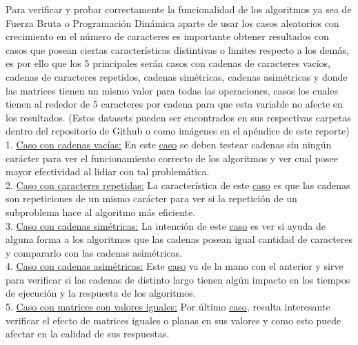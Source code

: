 Para verificar y probar correctamente la funcionalidad de los algoritmos ya sea de Fuerza Bruta o Programación Dinámica aparte de usar los casos aleatorios con crecimiento en el número de caracteres es importante obtener resultados con casos que posean ciertas características distintivas o limites respecto a los demás, es por ello que los 5 principales serán casos con cadenas de caracteres vacíos, cadenas de caracteres repetidos, cadenas simétricas, cadenas asimétricas y donde las matrices tienen un mismo valor para todas las operaciones, casos los cuales tienen al rededor de 5 caracteres por cadena para que esta variable no afecte en los resultados. (Estos datasets pueden ser encontrados en sus respectivas carpetas dentro del repositorio de Github o como imágenes en el apéndice de este reporte)\\

1. \underline{Caso con cadenas vacías:} En este \hyperref[fig:imagen1]{caso} se deben testear cadenas sin ningún carácter para ver el funcionamiento correcto de los algoritmos y ver cual posee mayor efectividad al lidiar con tal problemática.\\

2. \underline{Caso con caracteres repetidas:} La característica de este \hyperref[fig:imagen2]{caso} es que las cadenas son repeticiones de un mismo carácter para ver si la repetición de un subproblema hace al algoritmo más eficiente.\\

3. \underline{Caso con cadenas simétricas:} La intención de este \hyperref[fig:imagen3]{caso} es ver si ayuda de alguna forma a los algoritmos que las cadenas posean igual cantidad de caracteres y compararlo con las cadenas asimétricas.\\

4. \underline{Caso con cadenas asimétricas:} Este \hyperref[fig:imagen4]{caso} va de la mano con el anterior y sirve para verificar si las cadenas de distinto largo tienen algún impacto en los tiempos de ejecución y la respuesta de los algoritmos.\\

5. \underline{Caso con matrices con valores iguales:} Por último \hyperref[fig:imagen5]{caso}, resulta interesante verificar el efecto de matrices iguales o planas en sus valores y como esto puede afectar en la calidad de sus respuestas.\\
